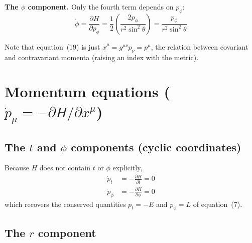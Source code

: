 \documentclass[11pt,a4paper]{article}
\begin{document}
\textbf{The $\phi$ component.} Only the fourth term depends on $p_\phi$:
\begin{equation*}
\dot{\phi} = \frac{\partial H}{\partial p_\phi} = \frac{1}{2}\left( \frac{2 p_\phi}{r^2 \sin^2\theta} \right) = \frac{p_\phi}{r^2 \sin^2\theta} \tag{19d}\label{eq:19d}
\end{equation*}

Note that equation~(19) is just $\dot{x}^\mu = g^{\mu\nu} p_\nu = p^\mu$, the relation between covariant and contravariant momenta (raising an index with the metric).

\section{Momentum equations \texorpdfstring{($\dot{p}_\mu = -\partial H / \partial x^\mu$)}{}}

\subsection{The \texorpdfstring{$t$ and $\phi$}{t and phi} components (cyclic coordinates)}

Because $H$ does not contain $t$ or $\phi$ explicitly,
\begin{align*}
    \dot{p}_t &= -\frac{\partial H}{\partial t} = 0 \tag{20a}\label{eq:20a} \\
    \dot{p}_\phi &= -\frac{\partial H}{\partial \phi} = 0 \tag{20b}\label{eq:20b}
\end{align*}
which recovers the conserved quantities $p_t = -E$ and $p_\phi = L$ of equation~(7).

\subsection{The \texorpdfstring{$r$}{r} component}
\end{document}
